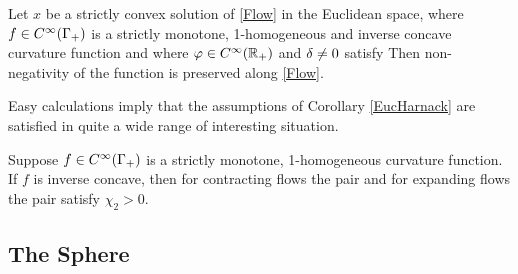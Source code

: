 \documentclass{amsart}
\begin{document}
\begin{corollary}\label{EucHarnack}
Let $x$ be a strictly convex solution of \eqref{Flow} in the Euclidean space, where $f\in C^{\infty}(\Gamma_+)$ is a strictly monotone, 1-homogeneous and inverse concave curvature function and where $\varphi\in C^{\infty}(\mathbb{R}_+)$ and $\delta\neq 0$ satisfy
Then non-negativity of the function
is preserved along \eqref{Flow}.
\end{corollary}


Easy calculations imply that the assumptions of Corollary \ref{EucHarnack} are satisfied in quite a wide range of interesting situation.

\begin{corollary}
Suppose $f\in C^{\infty}(\Gamma_+)$ is a strictly monotone, 1-homogeneous curvature function. If $f$ is inverse concave, then for contracting flows the pair
and for expanding flows the pair
satisfy $\chi_2>0$.
\end{corollary}

\subsection{The Sphere}
\end{document}
